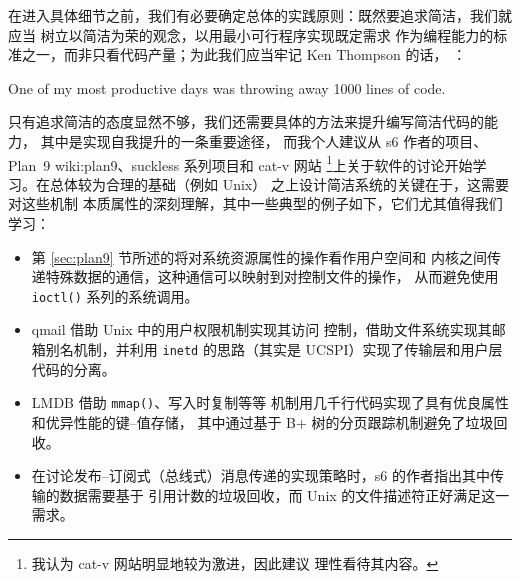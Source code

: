 在进入具体细节之前，我们有必要确定总体的实践原则：既然要追求简洁，我们就应当
树立以简洁为荣的观念，以用最小可行程序实现既定需求
作为编程能力的标准之一，而非只看代码产量；为此我们应当牢记 Ken Thompson 的话，%
：
\begin{quoting}
	One of my most productive days was throwing away 1000 lines of code.
\end{quoting}
只有追求简洁的态度显然不够，我们还需要具体的方法来提升编写简洁代码的能力，
其中是实现自我提升的一条重要途径，
而我个人建议从 s6 作者的项目、Plan~9\cupercite%
{wiki:plan9}、suckless 系列项目和 cat-v 网站%
\footnote{我认为 cat-v 网站明显地较为激进，因此建议
理性看待其内容。}上关于软件的讨论开始学习。在总体较为合理的基础（例如 Unix）
之上设计简洁系统的关键在于，这需要对这些机制
本质属性的深刻理解，其中一些典型的例子如下，它们尤其值得我们学习：
\begin{itemize}
\item 第 \ref{sec:plan9} 节所述的将对系统资源属性的操作看作用户空间和
	内核之间传递特殊数据的通信，这种通信可以映射到对控制文件的操作，
	从而避免使用 \verb|ioctl()| 系列的系统调用。
\item qmail 借助 Unix 中的用户权限机制实现其访问
	控制，借助文件系统实现其邮箱别名机制，并利用 \verb|inetd| 的思路（其实是
	UCSPI）实现了传输层和用户层代码的分离。
\item LMDB 借助 \verb|mmap()|、写入时复制等等
	机制用几千行代码实现了具有优良属性和优异性能的键{--}值存储，
	其中通过基于 B+ 树的分页跟踪机制避免了垃圾回收。
\item 在讨论发布{--}订阅式（总线式）消息传递的实现策略时，s6
	的作者指出其中传输的数据需要基于
	引用计数的垃圾回收，而 Unix 的文件描述符正好满足这一需求。
\end{itemize}

